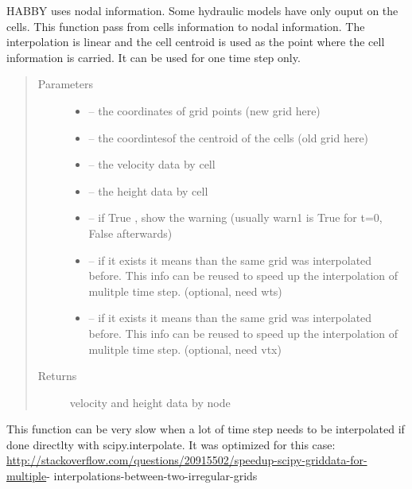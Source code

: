 \documentclass[letterpaper,10pt,english]{sphinxmanual}
\begin{document}
\begin{fulllineitems}
\label{\detokenize{index:src.manage_grid_8.pass_grid_cell_to_node_lin}}
HABBY uses nodal information. Some hydraulic models have only ouput on the cells. This function pass
from cells information to nodal information. The interpolation is linear and the cell centroid is used as the
point where the cell information is carried. It can be used for one time step only.
\begin{quote}\begin{description}
\item[{Parameters}] \leavevmode\begin{itemize}
\item {} 
 -- the coordinates of grid points (new grid here)

\item {} 
 -- the coordintesof the centroid of the cells (old grid here)

\item {} 
 -- the velocity data by cell

\item {} 
 -- the height data by cell

\item {} 
 -- if True , show the warning (usually warn1 is True for t=0, False afterwards)

\item {} 
 -- if it exists it means than the same grid was interpolated before. This info can be reused to
speed up the interpolation of mulitple time step. (optional, need wts)

\item {} 
 -- if it exists it means than the same grid was interpolated before. This info can be reused to
speed up the interpolation of mulitple time step. (optional, need vtx)

\end{itemize}

\item[{Returns}] \leavevmode
velocity and height data by node

\end{description}\end{quote}


This function can be very slow when a lot of time step needs to be interpolated if done directlty with
scipy.interpolate. It was optimized for this case:
\url{http://stackoverflow.com/questions/20915502/speedup-scipy-griddata-for-multiple}-
interpolations-between-two-irregular-grids

\end{fulllineitems}
\end{document}
